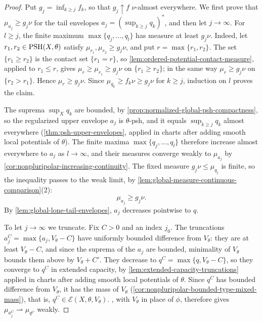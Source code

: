 \begin{proof}
Put $g_j=\inf_{k\geq j}f_k$, so that $g_j\uparrow f$ $\nu$-almost everywhere. We first prove that $\mu_{a_j}\geq g_j\nu$ for the tail envelopes $a_j=(\sup_{k\geq j}q_k)^*$, and then let $j\to\infty$. For $l\geq j$, the finite maximum $\max\{q_j,\ldots,q_l\}$ has measure at least $g_j\nu$. Indeed, let $r_1,r_2\in\mathrm{PSH}(X,\theta)$ satisfy $\mu_{r_1},\mu_{r_2}\geq g_j\nu$, and put $r=\max\{r_1,r_2\}$. The set $\{r_1\geq r_2\}$ is the contact set $\{r_1=r\}$, so \cref{lem:ordered-potential-contact-measure}, applied to $r_1\leq r$, gives $\mu_r\geq\mu_{r_1}\geq g_j\nu$ on $\{r_1\geq r_2\}$; in the same way $\mu_r\geq g_j\nu$ on $\{r_2>r_1\}$. Hence $\mu_r\geq g_j\nu$. Since $\mu_{q_k}\geq f_k\nu\geq g_j\nu$ for $k\geq j$, induction on $l$ proves the claim.

The suprema $\sup_Xq_k$ are bounded, by \cref{prop:normalized-global-psh-compactness}, so the regularized upper envelope $a_j$ is $\theta$-psh, and it equals $\sup_{k\geq j}q_k$ almost everywhere (\cref{thm:psh-upper-envelopes}, applied in charts after adding smooth local potentials of $\theta$). The finite maxima $\max\{q_j,\ldots,q_l\}$ therefore increase almost everywhere to $a_j$ as $l\to\infty$, and their measures converge weakly to $\mu_{a_j}$ by \cref{cor:nonpluripolar-increasing-continuity}. The fixed measure $g_j\nu\leq\mu_{q_j}$ is finite, so the inequality passes to the weak limit, by \cref{lem:global-measure-continuous-comparison}(2):
\[
 \mu_{a_j}\geq g_j\nu.
\]
By \cref{lem:global-lone-tail-envelopes}, $a_j$ decreases pointwise to $q$.

To let $j\to\infty$ we truncate. Fix $C>0$ and an index $j_0$. The truncations $a_j^C=\max\{a_j,V_\theta-C\}$ have uniformly bounded difference from $V_\theta$: they are at least $V_\theta-C$, and since the suprema of the $a_j$ are bounded, minimality of $V_\theta$ bounds them above by $V_\theta+C'$. They decrease to $q^C=\max\{q,V_\theta-C\}$, so they converge to $q^C$ in extended capacity, by \cref{lem:extended-capacity-truncations} applied in charts after adding smooth local potentials of $\theta$. Since $q^C$ has bounded difference from $V_\theta$, it has the mass of $V_\theta$ (\cref{cor:nonpluripolar-bounded-type-mixed-mass}), that is, $q^C\in\mathcal E(X,\theta,V_\theta)$. , with $V_\theta$ in place of $\phi$, therefore gives $\mu_{a_j^C}\rightharpoonup\mu_{q^C}$ weakly.


\end{proof}
